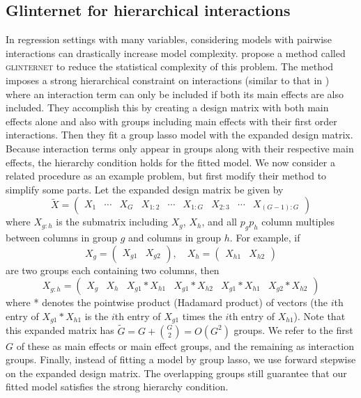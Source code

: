 \documentclass{imsart}
\begin{document}
\subsection{Glinternet for hierarchical interactions}
\label{sec:glint}
In regression settings with many variables, considering models with pairwise interactions can drastically increase model complexity. \cite{glint} propose a method called \textsc{glinternet} to reduce the statistical complexity of this problem. The method imposes a strong hierarchical constraint on interactions (similar to that in \cite{bien:hierarchical}) where an interaction term can only be included if both its main effects are also included. They accomplish this by creating a design matrix with both main effects alone and also with groups including main effects with their first order interactions. Then they fit a group lasso model with the expanded design matrix. Because interaction terms only appear in groups along with their respective main effects, the hierarchy condition holds for the fitted model. We now consider a related procedure as an example problem, but first modify their method to simplify some parts. Let the expanded design matrix be given by
\begin{equation}
\label{eq:glintmat}
\tilde X = \begin{pmatrix} X_1 & \cdots & X_G & X_{1:2} & \cdots & X_{1:G} & X_{2:3} & \cdots & X_{(G-1):G}  \end{pmatrix}
\end{equation}
where $X_{g:h}$ is the submatrix including $X_g$, $X_h$, and all
$p_gp_h$  column multiples between columns in group $g$ and columns
in group $h$. For example, if
\[
X_g = \begin{pmatrix} X_{g1} & X_{g2} \end{pmatrix}, \quad
X_h = \begin{pmatrix} X_{h1} & X_{h2} \end{pmatrix}
\]
are two groups each containing two columns, then
\[
X_{g:h} = \begin{pmatrix} X_g & X_h & X_{g1} * X_{h1} & X_{g1} * X_{h2} & X_{g1} * X_{h1} & X_{g2} * X_{h2} \end{pmatrix}
\]
where * denotes the pointwise product (Hadamard product) of vectors
(the $i$th entry of $X_{g1} * X_{h1}$ is the $i$th entry of $X_{g1}$ times
the $i$th entry of $X_{h1}$). Note that this expanded matrix has
$\tilde G = G + \binom{G}{2} = O(G^2)$ groups. We refer to the first
$G$ of these as main effects or main effect groups, and the remaining
as interaction groups. Finally, instead of fitting a
model by group lasso, we use forward stepwise on the expanded design
matrix. The overlapping groups still guarantee that our fitted model
satisfies the strong hierarchy condition. 
\end{document}
